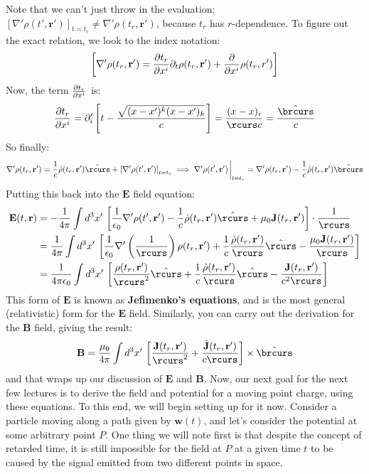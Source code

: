 Note that we can't just throw in the evaluation: \( [\nabla' \rho(t', \mathbf{r}')]_{t = t_r} \neq \nabla'
\rho(t_r, \mathbf{r}') \), because \( t_r \) has \( r \)-dependence. To figure out the exact relation, we
look to the index notation:
\[
	\left[ \nabla' \rho(t_r, \mathbf{r}') = \pdv{t_r}{x^{i}} \partial_t \rho (t_r, \mathbf{r}') + \pdv{x^{i}}
	\rho(t_r, r')\right]
\]
Now, the term \( \pdv{t_r}{x^{i}} \) is:
\[
	\pdv{t_r}{x^{i}} = \partial_i' \left[ t - \frac{\sqrt{(x - x')^{k}(x - x')_k}}{c} \right] = \frac{(x -
	x)_i}{\rcurs c} = \frac{\hat{\brcurs}}{c}
\]
So finally:
\[
	\nabla' \rho(t_r, \mathbf{r}') = \frac{1}{c}\dot{\rho}(t_r, \mathbf{r}') \hat{\rcurs} + \left[ \nabla'
	\rho(t', \mathbf{r}') \right]_{t = t_r} \implies \nabla' \rho(t', \mathbf{r}')\eval_{t = t_r} = \nabla'
	\rho(t_r, \mathbf{r}') - \frac{1}{c}\dot{\rho}(t_r, \mathbf{r}') \hat{\brcurs}
\]
Putting this back into the \( \mathbf{E} \) field equation:
\begin{align*}
	\mathbf{E}(t, \mathbf{r}) &= -\frac{1}{4\pi}\int d^3x' \, \left[ \frac{1}{\epsilon_0}\nabla' \rho(t',
	\mathbf{r}') - \frac{1}{c}\dot{\rho}(t_r, \mathbf{r}') \hat{\rcurs} + \mu_0 \mathbf{J}(t_r, \mathbf{r}')
\right]\cdot \frac{1}{\rcurs} \\ 
&= \frac{1}{4\pi} \int d^3x' \, \left[ \frac{1}{\epsilon_0} \nabla' \left( \frac{1}{\rcurs} \right) \rho(t_r,
\mathbf{r}') + \frac{1}{c} \frac{\dot{\rho}(t_r, \mathbf{r}')}{\rcurs}\hat{\rcurs} - \frac{\mu_0
\mathbf{J}(t_r, \mathbf{r}')}{\rcurs}\right] \\ 
&= \frac{1}{4\pi \epsilon_0} \int d^3x' \, \left[ \frac{\rho(t_r, \mathbf{r}')}{\rcurs^2}\hat{\rcurs} 
	+ \frac{1}{c} \frac{\dot{\rho}(t_r, \mathbf{r}')}{\rcurs}\hat{\rcurs} - \frac{\mathbf{J}(t_r,
\mathbf{r}')}{c^2 \rcurs} \right]
\end{align*}
This form of \( \mathbf{E} \) is known as \textbf{Jefimenko's equations}, and is the most general
(relativistic) form for the \( \mathbf{E} \) field. Similarly, you can carry out the derivation for the \(
\mathbf{B} \) field, giving the result:
\[
	\mathbf{B} = \frac{\mu_0}{4\pi}\int d^3x' \, \left[ \frac{\mathbf{J}(t_r, \mathbf{r}')}{\rcurs^2} +
	\frac{\dot{\mathbf{J}}(t_r, \mathbf{r}')}{c \rcurs} \right] \times \hat{\brcurs}
\]
and that wraps up our discussion of \( \mathbf{E} \) and \( \mathbf{B} \). Now, our next goal for the next
few lectures is to derive the field and potential for a moving point charge, using these equations. To this
end, we will begin setting up for it now. Consider a particle moving along a path given by \( \mathbf{w}(t)
\), and let's consider the potential at some arbitrary point \( P \). One thing we will note first is that
despite the concept of retarded time, it is still impossible for the field at \( P \) at a given time \( t \)
to be caused by the signal emitted from two different points in space.  

